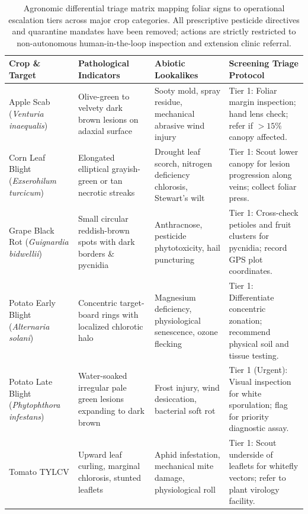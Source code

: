 \documentclass[pdflatex,sn-mathphys-num]{sn-jnl}
\theoremstyle{thmstyleone}%
\theoremstyle{thmstyletwo}%
\theoremstyle{thmstylethree}%
\begin{document}
\begin{appendices}
\begin{table}[h]
\caption{Agronomic differential triage matrix mapping foliar signs to operational escalation tiers across major crop categories. All prescriptive pesticide directives and quarantine mandates have been removed; actions are strictly restricted to non-autonomous human-in-the-loop inspection and extension clinic referral.}\label{tab:field_matrix}%
\setlength{\tabcolsep}{2.5pt}%
\begin{tabular*}{\textwidth}{@{\extracolsep\fill}p{2.3cm}p{3.2cm}p{2.5cm}p{3.6cm}}
\toprule
\textbf{Crop \& Target} & \textbf{Pathological Indicators} & \textbf{Abiotic Lookalikes} & \textbf{Screening Triage Protocol} \\
\midrule
Apple Scab (\textit{Venturia inaequalis}) & \raggedright Olive-green to velvety dark brown lesions on adaxial surface & \raggedright Sooty mold, spray residue, mechanical abrasive wind injury & \raggedright Tier 1: Foliar margin inspection; hand lens check; refer if $>15\%$ canopy affected. \\
Corn Leaf Blight (\textit{Exserohilum turcicum}) & \raggedright Elongated elliptical grayish-green or tan necrotic streaks & \raggedright Drought leaf scorch, nitrogen deficiency chlorosis, Stewart's wilt & \raggedright Tier 1: Scout lower canopy for lesion progression along veins; collect foliar press. \\
Grape Black Rot (\textit{Guignardia bidwellii}) & \raggedright Small circular reddish-brown spots with dark borders \& pycnidia & \raggedright Anthracnose, pesticide phytotoxicity, hail puncturing & \raggedright Tier 1: Cross-check petioles and fruit clusters for pycnidia; record GPS plot coordinates. \\
Potato Early Blight (\textit{Alternaria solani}) & \raggedright Concentric target-board rings with localized chlorotic halo & \raggedright Magnesium deficiency, physiological senescence, ozone flecking & \raggedright Tier 1: Differentiate concentric zonation; recommend physical soil and tissue testing. \\
Potato Late Blight (\textit{Phytophthora infestans}) & \raggedright Water-soaked irregular pale green lesions expanding to dark brown & \raggedright Frost injury, wind desiccation, bacterial soft rot & \raggedright Tier 1 (Urgent): Visual inspection for white sporulation; flag for priority diagnostic assay. \\
Tomato TYLCV & \raggedright Upward leaf curling, marginal chlorosis, stunted leaflets & \raggedright Aphid infestation, mechanical mite damage, physiological roll & \raggedright Tier 1: Scout underside of leaflets for whitefly vectors; refer to plant virology facility. \\

\end{tabular*}
\end{table}
\end{appendices}
\end{document}

